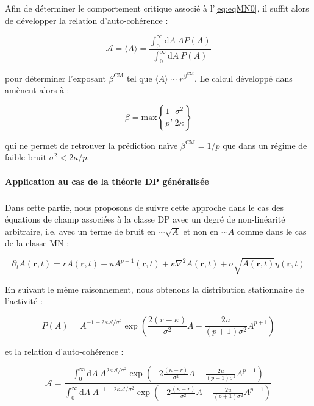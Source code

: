 \subparagraph{}Afin de déterminer le comportement critique associé à l'\autoref{eq:eqMN0}, il suffit alors de développer la relation d'auto-cohérence :

\begin{equation}
    \mathcal{A} = \langle A \rangle = \frac{\int_0^\infty\mathrm{d}A~A P(A)}{\int_0^\infty\mathrm{d}A~P(A)}
\end{equation}

\noindent pour déterminer l'exposant $\beta^\text{CM}$ tel que $\langle A \rangle \sim r^{\beta^\text{CM}}$. Le calcul développé dans \cite{munoz_multiplicative_2003, munoz_mean_field_2005} amènent alors à :

\begin{equation}
	\beta = \mathrm{max}\left\{ \frac{1}{p}, \frac{\sigma^2}{2\kappa}\right\}
\end{equation}

\noindent qui ne permet de retrouver la prédiction naïve $\beta^\text{CM} = 1/p$ que dans un régime de faible bruit $\sigma^2 < 2\kappa/p$.

\paragraph{Application au cas de la théorie DP généralisée}

\subparagraph{}Dans cette partie, nous proposons de suivre cette approche dans le cas des équations de champ associées à la classe DP avec un degré de non-linéarité arbitraire, i.e. avec un terme de bruit en $\sim \sqrt{A}$ et non en $\sim A$ comme dans le cas de la classe MN :

\begin{equation}
	\partial_t A(\mathbf{r}, t) = rA(\mathbf{r}, t) - uA^{p+1}(\mathbf{r}, t) + \kappa\nabla^2 A (\mathbf{r}, t) + \sigma \sqrt{A(\mathbf{r}, t)} \eta(\mathbf{r}, t)
	\label{eq:eqDParb}
\end{equation}

\noindent En suivant le même raisonnement, nous obtenons la distribution stationnaire de l'activité :

\begin{equation}
    P(A)=A^{-1+2\kappa\mathcal{A}/\sigma^2}\exp\left( \frac{2(r-\kappa)}{\sigma^2}A-\frac{2u}{(p+1)\sigma^2}A^{p+1} \right)
\end{equation}

\noindent et la relation d'auto-cohérence :

\begin{equation}
    \mathcal{A} = \frac{\int_ 0^\infty \mathrm{d}A~A^{2\kappa\mathcal{A}/\sigma^2}\exp\left( -2\frac{(\kappa-r)}{\sigma^2} A - \frac{2u}{(p+1)\sigma^2}A^{p+1} \right)}{\int_ 0^\infty \mathrm{d}A~A^{-1+2\kappa\mathcal{A}/\sigma^2}\exp\left( -2\frac{(\kappa-r)}{\sigma^2} A - \frac{2u}{(p+1)\sigma^2}A^{p+1} \right)}
\end{equation}


